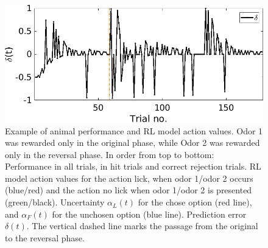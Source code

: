 \begin{figure}
    \includegraphics[scale=0.45]{figures/DeltaEndrevAn1.png}
    \caption{Example of animal performance and RL model action
values. Odor 1 was rewarded only in the original phase, while Odor 2 was rewarded only in the reversal phase. In order from top to bottom: Performance in all trials, in hit trials and correct rejection trials. RL model action values for the action lick, when odor 1/odor 2 occurs (blue/red) and the action no lick when odor 1/odor 2 is presented (green/black). Uncertainty $\alpha_L(t)$ for the chose option (red line), and $\alpha_F(t)$ for the unchosen option (blue line). Prediction error $\delta(t)$. The vertical dashed line marks the passage from the original to the reversal phase.}
    \label{fig:L-Fmodel}
\end{figure}
